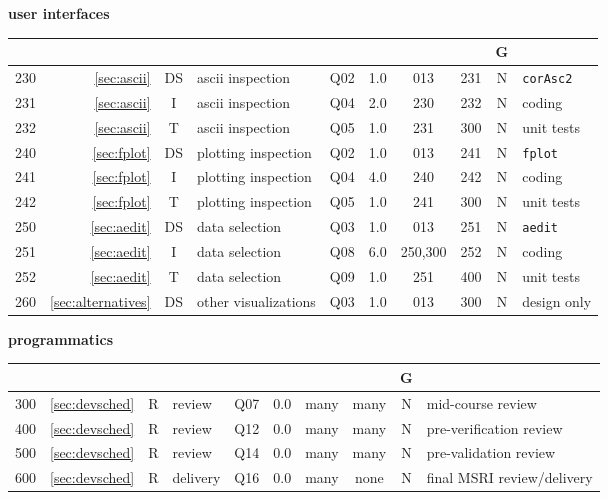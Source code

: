 \small
\textbf{user interfaces}\hfill\break
\noindent
\begin{tabular}{r|r|c|l|c|c|c|c|c|l}
\hline
\usebox{\NM}&\usebox{\REF}&\usebox{\WW}&\usebox{\TPC}&\usebox{\ST}&\usebox{\EFF}&\usebox{\PRD}&\usebox{\SCC}&G&\usebox{\CMTS}\\
\hline
\hline
230&\ref{sec:ascii}                &DS& ascii inspection     & Q02 & 1.0 & 013     & 231 & N & \texttt{corAsc2} \\
231&\ref{sec:ascii}                &I & ascii inspection     & Q04 & 2.0 & 230     & 232 & N & coding \\
232&\ref{sec:ascii}                &T & ascii inspection     & Q05 & 1.0 & 231     & 300 & N & unit tests \\
240&\ref{sec:fplot}                &DS& plotting inspection  & Q02 & 1.0 & 013     & 241 & N & \texttt{fplot} \\
241&\ref{sec:fplot}                &I & plotting inspection  & Q04 & 4.0 & 240     & 242 & N & coding \\
242&\ref{sec:fplot}                &T & plotting inspection  & Q05 & 1.0 & 241     & 300 & N & unit tests \\
250&\ref{sec:aedit}                &DS& data selection       & Q03 & 1.0 & 013     & 251 & N & \texttt{aedit} \\
251&\ref{sec:aedit}                &I & data selection       & Q08 & 6.0 & 250,300 & 252 & N & coding \\
252&\ref{sec:aedit}                &T & data selection       & Q09 & 1.0 & 251     & 400 & N & unit tests \\
260&\ref{sec:alternatives}         &DS& other visualizations & Q03 & 1.0 & 013     & 300 & N & design only \\
\hline
\end{tabular}\vspace{6mm}

\small
\textbf{programmatics}\hfill\break
\noindent
\begin{tabular}{r|r|c|l|c|c|c|c|c|l}
\hline
\usebox{\NM}&\usebox{\REF}&\usebox{\WW}&\usebox{\TPC}&\usebox{\ST}&\usebox{\EFF}&\usebox{\PRD}&\usebox{\SCC}&G&\usebox{\CMTS}\\
\hline
\hline
300&\ref{sec:devsched}             &R & review               & Q07 & 0.0 & many & many & N & mid-course review \\
400&\ref{sec:devsched}             &R & review               & Q12 & 0.0 & many & many & N & pre-verification review \\
500&\ref{sec:devsched}             &R & review               & Q14 & 0.0 & many & many & N & pre-validation review \\
600&\ref{sec:devsched}             &R & delivery             & Q16 & 0.0 & many & none & N & final MSRI review/delivery \\
\hline
\end{tabular}

%
%
